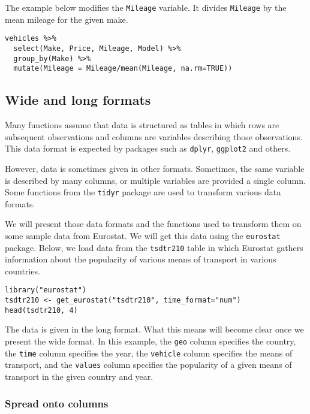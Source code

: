 \documentclass[]{book}
\theoremstyle{definition}
\theoremstyle{definition}
\theoremstyle{definition}
\theoremstyle{remark}
\begin{document}
The example below modifies the \texttt{Mileage} variable. It divides
\texttt{Mileage} by the mean mileage for the given make.

\begin{verbatim}
vehicles %>%
  select(Make, Price, Mileage, Model) %>%
  group_by(Make) %>%
  mutate(Mileage = Mileage/mean(Mileage, na.rm=TRUE))
\end{verbatim}

\subsection{Wide and long formats}\label{part_257}

Many functions assume that data is structured as tables in which rows
are subsequent observations and columns are variables describing those
observations. This data format is expected by packages such as
\texttt{dplyr}, \texttt{ggplot2} and others.

However, data is sometimes given in other formats. Sometimes, the same
variable is described by many columns, or multiple variables are
provided a single column. Some functions from the \texttt{tidyr} package
are used to transform various data formats.

We will present those data formats and the functions used to transform
them on some sample data from Eurostat. We will get this data using the
\texttt{eurostat} package. Below, we load data from the
\texttt{tsdtr210} table in which Eurostat gathers information about the
popularity of various means of transport in various countries.

\begin{verbatim}
library("eurostat")
tsdtr210 <- get_eurostat("tsdtr210", time_format="num")
head(tsdtr210, 4)
\end{verbatim}

The data is given in the long format. What this means will become clear
once we present the wide format. In this example, the \texttt{geo}
column specifies the country, the \texttt{time} column specifies the
year, the \texttt{vehicle} column specifies the means of transport, and
the \texttt{values} column specifies the popularity of a given means of
transport in the given country and year.

\subsubsection*{Spread onto columns}\label{spread-onto-columns}
\end{document}
